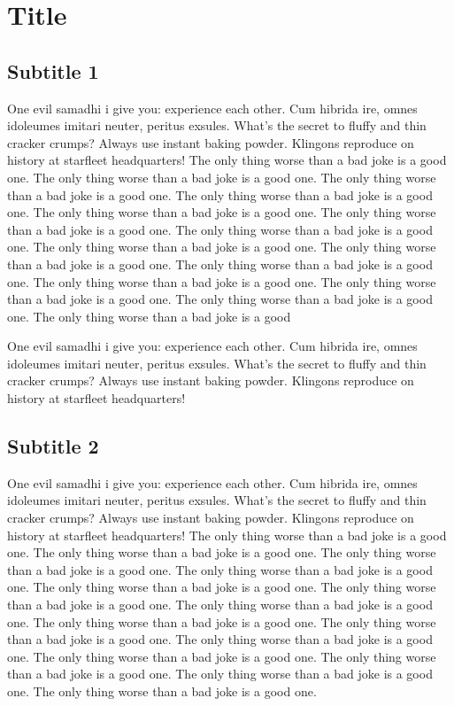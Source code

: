 \documentclass[a4paper,12p]{thesis}
\begin{document}
\section*{Title}
\subsection*{Subtitle 1}
One evil samadhi i give you: experience each other.
Cum hibrida ire, omnes idoleumes imitari neuter, peritus exsules.
    What’s the secret to fluffy and thin cracker crumps?
    Always use instant baking powder.
    Klingons reproduce on history at starfleet headquarters!
    The only thing worse than a bad joke is a good one.
    The only thing worse than a bad joke is a good one.
    The only thing worse than a bad joke is a good one.
    The only thing worse than a bad joke is a good one.
    The only thing worse than a bad joke is a good one.
    The only thing worse than a bad joke is a good one.
    The only thing worse than a bad joke is a good one.
    The only thing worse than a bad joke is a good one.
    The only thing worse than a bad joke is a good one.
    The only thing worse than a bad joke is a good one.
    The only thing worse than a bad joke is a good one.
    The only thing worse than a bad joke is a good one.
    The only thing worse than a bad joke is a good one.
    The only thing worse than a bad joke is a good

One evil samadhi i give you: experience each other.
Cum hibrida ire, omnes idoleumes imitari neuter, peritus exsules.
What’s the secret to fluffy and thin cracker crumps?
Always use instant baking powder.
Klingons reproduce on history at starfleet headquarters!

\subsection*{Subtitle 2}
One evil samadhi i give you: experience each other.
Cum hibrida ire, omnes idoleumes imitari neuter, peritus exsules.
What’s the secret to fluffy and thin cracker crumps?
Always use instant baking powder.
Klingons reproduce on history at starfleet headquarters!
The only thing worse than a bad joke is a good one.
The only thing worse than a bad joke is a good one.
The only thing worse than a bad joke is a good one.
The only thing worse than a bad joke is a good one.
The only thing worse than a bad joke is a good one.
The only thing worse than a bad joke is a good one.
The only thing worse than a bad joke is a good one.
The only thing worse than a bad joke is a good one.
The only thing worse than a bad joke is a good one.
The only thing worse than a bad joke is a good one.
The only thing worse than a bad joke is a good one.
The only thing worse than a bad joke is a good one.
The only thing worse than a bad joke is a good one.
The only thing worse than a bad joke is a good one.
\end{document}

